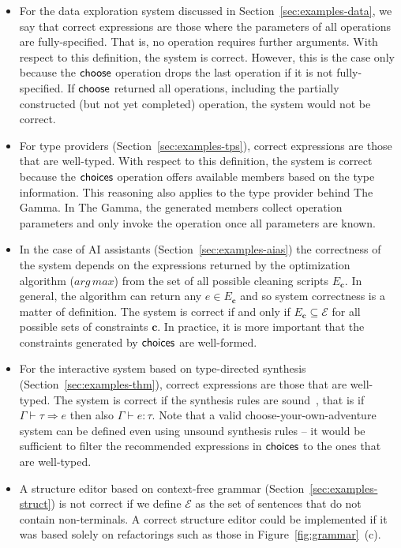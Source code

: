 \documentclass[anonymous, a4paper,UKenglish,cleveref, autoref, thm-restate]{lipics-v2021}
\newcommand{\ident}[1]{\textsf{#1}}
\newcommand{\select}{\textnormal{\ident{choose}}}
\newcommand{\choices}{\textnormal{\ident{choices}}}
\begin{document}
\begin{itemize}
\setlength{\itemsep}{5pt}
\item For the data exploration system discussed in Section~\ref{sec:examples-data}, we say that
  correct expressions are those where the parameters of all operations are fully-specified.
  That is, no operation requires further arguments. With respect to this definition,
  the system is correct. However, this is the case only because the $\select$ operation drops the last
  operation if it is not fully-specified. If $\select$ returned all operations, including the
  partially constructed (but not yet completed) operation, the system would not be correct.

\item For type providers (Section~\ref{sec:examples-tps}), correct expressions are those that
  are well-typed. With respect to this definition, the system is correct because the $\choices$
  operation offers available members based on the type information. This reasoning also applies to the
  type provider behind The Gamma. In The Gamma, the generated members collect operation parameters
  and only invoke the operation once all parameters are known.

\item In the case of AI assistants (Section~\ref{sec:examples-aias}) the correctness of the system
  depends on the expressions returned by the optimization algorithm ($\mathit{arg\,max}$) from the
  set of all possible cleaning scripts $E_{\boldsymbol{c}}$. In general, the algorithm can return
  any $e\in E_{\boldsymbol{c}}$ and so system correctness is a matter of definition. The system
  is correct if and only if $E_{\boldsymbol{c}}\subseteq\mathcal{E}$ for all possible sets of
  constraints $\boldsymbol{c}$. In practice, it is more important that the constraints generated
  by $\choices$ are well-formed.

\item For the interactive system based on type-directed synthesis (Section~\ref{sec:examples-thm}),
  correct expressions are those that are well-typed. The system is correct if the synthesis rules
  are sound~\cite{osera-2015-synthesis}, that is if $\Gamma \vdash \tau \Rightarrow e$ then also
  $\Gamma \vdash e : \tau$. Note that a valid choose-your-own-adventure system can be defined
  even using unsound synthesis rules -- it would be sufficient to filter the recommended
  expressions in $\choices$ to the ones that are well-typed.

\item A structure editor based on context-free grammar (Section~\ref{sec:examples-struct})
  is not correct if we define $\mathcal{E}$ as the set of sentences that do not contain
  non-terminals. A correct structure editor could be implemented if it was based
  solely on refactorings such as those in Figure~\ref{fig:grammar}~(c).
\end{itemize}
\end{document}
